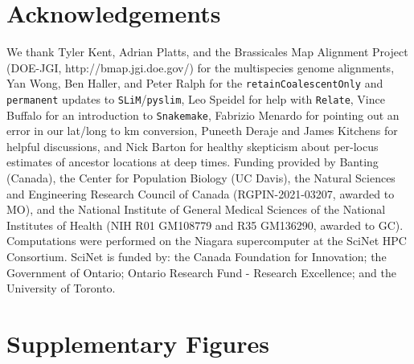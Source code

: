 \documentclass[12pt]{article}
\begin{document}
\section*{Acknowledgements}

We thank Tyler Kent, Adrian Platts, and the Brassicales Map Alignment Project (DOE-JGI, http://bmap.jgi.doe.gov/) for the multispecies genome alignments,
Yan Wong, Ben Haller, and Peter Ralph for the \texttt{retainCoalescentOnly} and \texttt{permanent} updates to \texttt{SLiM}/\texttt{pyslim}, 
Leo Speidel for help with \texttt{Relate}, 
Vince Buffalo for an introduction to \texttt{Snakemake},
Fabrizio Menardo for pointing out an error in our lat/long to km conversion,
Puneeth Deraje and James Kitchens for helpful discussions,
and Nick Barton for healthy skepticism about per-locus estimates of ancestor locations at deep times.
%
Funding provided by Banting (Canada), the Center for Population Biology (UC Davis), the Natural Sciences and Engineering Research Council of Canada (RGPIN-2021-03207, awarded to MO), and the National Institute of General Medical Sciences of the National Institutes of Health (NIH R01 GM108779 and R35 GM136290, awarded to GC).
Computations were performed on the Niagara supercomputer at the SciNet HPC Consortium. 
SciNet is funded by: the Canada Foundation for Innovation; the Government of Ontario; Ontario Research Fund - Research Excellence; and the University of Toronto.

%



\section*{Supplementary Figures}
\label{sec:appendix}
\end{document}
